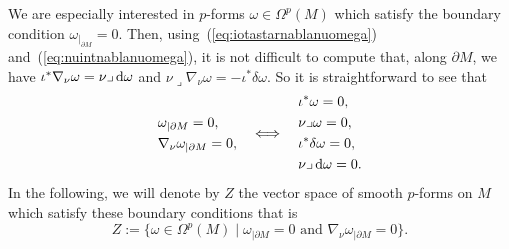 \documentclass[10pt,a4paper]{amsart}
\numberwithin{equation}{section}
\theoremstyle{definition}
\begin{document}
We are especially interested in $p$-forms $\omega\in\Omega^p(M)$ which satisfy the boundary condition $\omega_{|_{\partial M}}=0$.
Then, using~(\ref{eq:iotastarnablanuomega}) and~(\ref{eq:nuintnablanuomega}), it is not difficult to compute that, along $\partial M$, we have $\iota^*\nabla_\nu\omega=\nu\lrcorner\,{\rm d}\omega$ and $\nu\lrcorner\nabla_\nu\omega=-\iota^*\delta\omega$.
So it is straightforward to see that
\begin{equation}\label{Zcharacterization}
\begin{aligned}
&\omega_{|\partial M} = 0,\\
&\nabla_\nu\omega_{|\partial M} = 0,
\end{aligned}
\quad\Longleftrightarrow\quad
\begin{aligned}
& \iota^*\omega = 0,\\
& \nu\lrcorner\omega = 0,\\
& \iota^*\delta\omega = 0,\\
& \nu\lrcorner\,{\rm d}\omega = 0.
\end{aligned}
\end{equation}
In the following, we will denote by $Z$ the vector space of smooth $p$-forms on $M$ which satisfy these boundary conditions that is
\begin{equation*}%
Z:=\big\{\omega\in\Omega^p(M)\mid \omega_{|\partial M} = 0\text{ and }\nabla_\nu\omega_{|\partial M} = 0\big\}.
\end{equation*}
\end{document}
